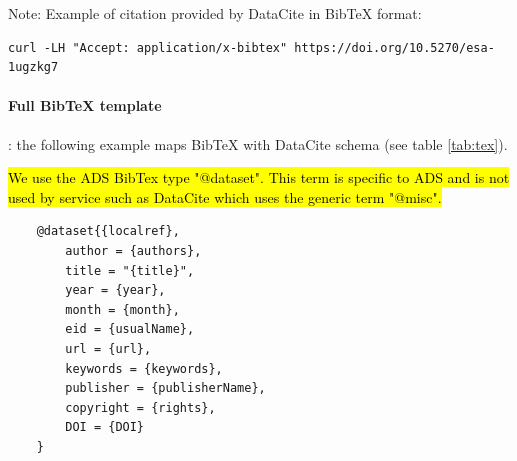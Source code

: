 \documentclass[11pt,a4paper]{ivoa}
\begin{document}

Note: Example of citation provided by DataCite in BibTeX format:

\begin{verbatim}
curl -LH "Accept: application/x-bibtex" https://doi.org/10.5270/esa-1ugzkg7
\end{verbatim}


\paragraph{Full BibTeX template} : the following example maps BibTeX with DataCite schema (see table \ref{tab:tex}).

\hl{We use the ADS BibTex type "@dataset". This term is specific to ADS and is not used by service such as DataCite which uses the generic term "@misc".} %

\begin{lstlisting}
	@dataset{{localref},
		author = {authors},
		title = "{title}",
		year = {year},
		month = {month},
		eid = {usualName},
		url = {url},
		keywords = {keywords},
		publisher = {publisherName},
		copyright = {rights},
		DOI = {DOI}
	}
\end{lstlisting}

\end{document}
